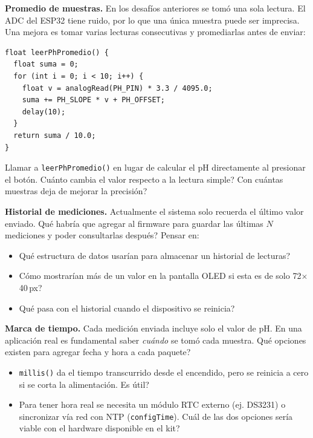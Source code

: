 \documentclass[12pt,leqno]{article}
\begin{document}
\bigskip
\begin{pensarbox}
\textbf{Promedio de muestras.} En los desaf\'ios anteriores se tom\'o una sola
lectura. El ADC del ESP32 tiene ruido, por lo que una \'unica muestra puede ser
imprecisa. Una mejora es tomar varias lecturas consecutivas y promediarlas antes
de enviar:

\begin{lstlisting}[numbers=none]
float leerPhPromedio() {
  float suma = 0;
  for (int i = 0; i < 10; i++) {
    float v = analogRead(PH_PIN) * 3.3 / 4095.0;
    suma += PH_SLOPE * v + PH_OFFSET;
    delay(10);
  }
  return suma / 10.0;
}
\end{lstlisting}

Llamar a \texttt{leerPhPromedio()} en lugar de calcular el pH directamente al
presionar el bot\'on. \textquestiondown Cu\'anto cambia el valor respecto a la
lectura simple? \textquestiondown Con cu\'antas muestras deja de mejorar la
precisi\'on?
\end{pensarbox}

\bigskip
\begin{pensarbox}
\textbf{Historial de mediciones.} Actualmente el sistema solo recuerda el \'ultimo
valor enviado. \textquestiondown Qu\'e habr\'ia que agregar al firmware para guardar
las \'ultimas $N$ mediciones y poder consultarlas despu\'es? Pensar en:

\begin{itemize}
    \item \textquestiondown Qu\'e estructura de datos usar\'ian para almacenar un
    historial de lecturas?
    \item \textquestiondown C\'omo mostrar\'ian m\'as de un valor en la pantalla
    OLED si esta es de solo 72$\times$40\,px?
    \item \textquestiondown Qu\'e pasa con el historial cuando el dispositivo se
    reinicia?
\end{itemize}
\end{pensarbox}

\bigskip
\begin{pensarbox}
\textbf{Marca de tiempo.} Cada medici\'on enviada incluye solo el valor de pH. En
una aplicaci\'on real es fundamental saber \textit{cu\'ando} se tom\'o cada muestra.
\textquestiondown Qu\'e opciones existen para agregar fecha y hora a cada paquete?

\begin{itemize}
    \item \texttt{millis()} da el tiempo transcurrido desde el encendido, pero se
    reinicia a cero si se corta la alimentaci\'on. \textquestiondown Es \'util?
    \item Para tener hora real se necesita un m\'odulo RTC externo (ej. DS3231)
    o sincronizar v\'ia red con NTP (\texttt{configTime}).
    \textquestiondown Cu\'al de las dos opciones ser\'ia viable con el hardware
    disponible en el kit?
\end{itemize}
\end{pensarbox}
\end{document}
